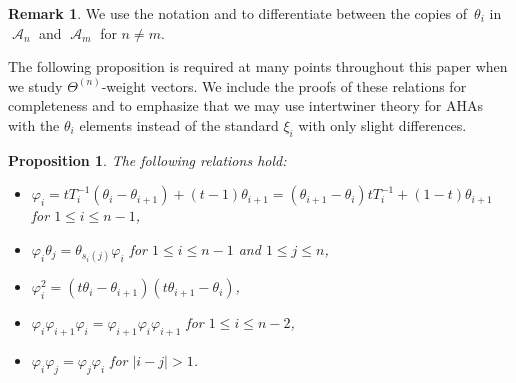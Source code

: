 \documentclass[pdftex]{sigma}
\numberwithin{equation}{section}
\newtheorem{Proposition}[Theorem]{Proposition}
\theoremstyle{definition}
\newtheorem{Remark}[Theorem]{Remark}
\DeclareMathOperator{\sA}{\mathscr{A}}
\begin{document}
\begin{Remark}
 We use the notation  and  to differentiate between the copies of~$\theta_i$ in~$\sA_n$ and $\sA_m$ for $n \neq m$.
\end{Remark}

The following proposition is required at many points throughout this paper when we study $\Theta^{(n)}$-weight vectors. We include the proofs of these relations for completeness and to emphasize that we may use intertwiner theory for AHAs with the $\theta_i$ elements instead of the standard $\xi_i$ with only slight differences.

\begin{Proposition}\label{additional relations for affine hecke}
 The following relations hold:
 \begin{itemize}
\itemsep=0pt
 \item $\varphi_i = tT_{i}^{-1}(\theta_i - \theta_{i+1}) + (t-1)\theta_{i+1} = (\theta_{i+1}-\theta_i)tT_i^{-1} + (1-t)\theta_{i+1}$ for $1 \leq i \leq n-1$,
 \item $\varphi_{i}\theta_j = \theta_{s_i(j)}\varphi_{i}$ for $1\leq i \leq n-1$ and $1 \leq j \leq n$,
 \item $\varphi_i^{2} = (t\theta_i-\theta_{i+1})(t\theta_{i+1}-\theta_{i})$,
 \item $\varphi_i\varphi_{i+1}\varphi_i=\varphi_{i+1}\varphi_i\varphi_{i+1}$ for $1\leq i \leq n-2$,
 \item $\varphi_i\varphi_j = \varphi_j\varphi_i$ for $|i-j| >1$.
 \end{itemize}
\end{Proposition}
\end{document}
